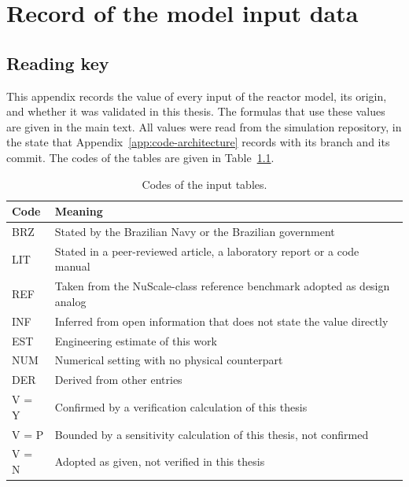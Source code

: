 
\chapter{Record of the model input data}
\label{app:model-inputs}
\label{app:labgene-data}

\section{Reading key}
\label{app:inputs-purpose}

This appendix records the value of every input of the reactor model,
its origin, and whether it was validated in this thesis. The formulas
that use these values are given in the main text. All values were read
from the simulation repository, in the state that
Appendix~\ref{app:code-architecture} records with its branch and its
commit. The codes of the tables are given
in Table~\ref{tab:in-key}.

\begin{table}[htbp]
  \centering
  \small
  \caption{Codes of the input tables.}
  \label{tab:in-key}
  \begin{tabularx}{\textwidth}{@{}l>{\raggedright\arraybackslash}X@{}}
    \toprule
    Code & Meaning \\
    \midrule
    BRZ & Stated by the Brazilian Navy or the Brazilian government \\
    LIT & Stated in a peer-reviewed article, a laboratory report or a code manual \\
    REF & Taken from the NuScale-class reference benchmark adopted as design analog \\
    INF & Inferred from open information that does not state the value directly \\
    EST & Engineering estimate of this work \\
    NUM & Numerical setting with no physical counterpart \\
    DER & Derived from other entries \\
    \midrule
    V = Y & Confirmed by a verification calculation of this thesis \\
    V = P & Bounded by a sensitivity calculation of this thesis, not confirmed \\
    V = N & Adopted as given, not verified in this thesis \\
    \bottomrule
  \end{tabularx}
\end{table}

